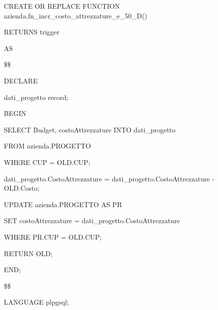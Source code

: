         \begin{flushleft}
            \begin{description}
                \item CREATE OR REPLACE FUNCTION azienda.fn\_incr\_costo\_attrezzature\_e\_50\_D()  
                \item RETURNS trigger
                \item AS
                \item \$\$
                \item DECLARE
                \begin{description}
                    \item dati\_progetto record;
                \end{description}
                \item BEGIN 
                \begin{description}
                    \item SELECT Budget, costoAttrezzature INTO dati\_progetto
                    \item FROM azienda.PROGETTO
                    \item WHERE CUP = OLD.CUP;
                
                    \vspace{0.5cm}

                    \item dati\_progetto.CostoAttrezzature = dati\_progetto.CostoAttrezzature - OLD.Costo;
                
                    \vspace{0.5cm}

                    \item UPDATE azienda.PROGETTO AS PR
                    \item SET costoAttrezzature = dati\_progetto.CostoAttrezzature
                    \item WHERE PR.CUP = OLD.CUP;
                
                    \item RETURN OLD;

                \end{description}

                \item END;
                \item \$\$
                \item LANGUAGE plpgsql;
            \end{description}
        \end{flushleft}
    \normalfont

